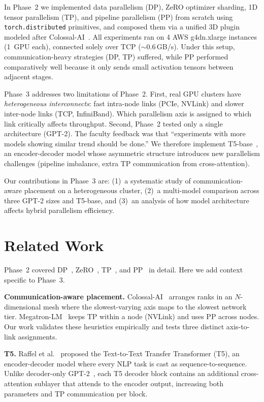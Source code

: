 \documentclass[conference]{IEEEtran}
\begin{document}
In Phase~2 we implemented data parallelism (DP), ZeRO optimizer sharding, 1D tensor parallelism (TP), and pipeline parallelism (PP) from scratch using \texttt{torch.distributed} primitives, and composed them via a unified 3D plugin modeled after Colossal-AI~\cite{10.1145/3605573.3605613}. All experiments ran on 4 AWS g4dn.xlarge instances (1~GPU each), connected solely over TCP ($\sim$0.6\,GB/s). Under this setup, communication-heavy strategies (DP, TP) suffered, while PP performed comparatively well because it only sends small activation tensors between adjacent stages.

Phase~3 addresses two limitations of Phase~2. First, real GPU clusters have \textit{heterogeneous interconnects}: fast intra-node links (PCIe, NVLink) and slower inter-node links (TCP, InfiniBand). Which parallelism axis is assigned to which link critically affects throughput. Second, Phase~2 tested only a single architecture (GPT-2). The faculty feedback was that ``experiments with more models showing similar trend should be done.'' We therefore implement T5-base~\cite{raffel2020exploring}, an encoder-decoder model whose asymmetric structure introduces new parallelism challenges (pipeline imbalance, extra TP communication from cross-attention).

Our contributions in Phase~3 are: (1)~a systematic study of communication-aware placement on a heterogeneous cluster, (2)~a multi-model comparison across three GPT-2 sizes and T5-base, and (3)~an analysis of how model architecture affects hybrid parallelism efficiency.

\section{Related Work}

Phase~2 covered DP~\cite{li2020pytorch, patarasuk2009bandwidth}, ZeRO~\cite{rajbhandari2019zero}, TP~\cite{DBLP:journals/corr/abs-1909-08053}, and PP~\cite{DBLP:journals/corr/abs-1811-06965, 10.1145/3341301.3359646} in detail. Here we add context specific to Phase~3.

\textbf{Communication-aware placement.} Colossal-AI~\cite{10.1145/3605573.3605613} arranges ranks in an $N$-dimensional mesh where the slowest-varying axis maps to the slowest network tier. Megatron-LM~\cite{DBLP:journals/corr/abs-1909-08053} keeps TP within a node (NVLink) and uses PP across nodes. Our work validates these heuristics empirically and tests three distinct axis-to-link assignments.

\textbf{T5.} Raffel et al.~\cite{raffel2020exploring} proposed the Text-to-Text Transfer Transformer (T5), an encoder-decoder model where every NLP task is cast as sequence-to-sequence. Unlike decoder-only GPT-2~\cite{radford2019language}, each T5 decoder block contains an additional cross-attention sublayer that attends to the encoder output, increasing both parameters and TP communication per block.
\end{document}
